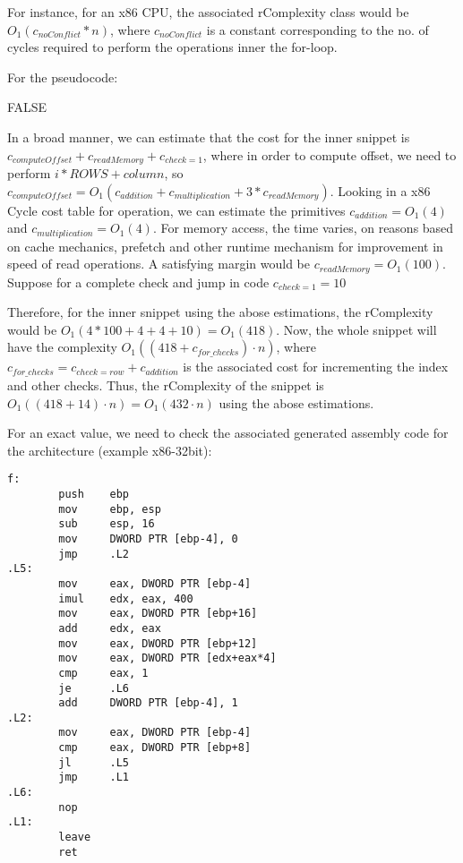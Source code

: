 For instance, for an x86 CPU, the associated rComplexity class would be
$ O_{1}(c_{noConflict} * n) $, where $c_{noConflict}$ is a constant corresponding to the no. of cycles required to perform the operations inner the for-loop.

For the pseudocode:
\begin{algorithmic}[1]
			\State \Return FALSE
		\EndIf
	\EndFor
\end{algorithmic}
In a broad manner, we can estimate that the cost for the inner snippet is $c_{computeOffset} + c_{readMemory} + c_{check=1}$, where in order to compute offset, we need to perform $i * ROWS + column$, so
$ c_{computeOffset} = O_{1}(c_{addition} + c_{multiplication} + 3 * c_{readMemory})$.
Looking in a x86 Cycle cost table for operation, we can estimate the primitives $c_{addition} = O_{1}(4)$ and $c_{multiplication} = O_{1}(4)$. For memory access, the time varies, on reasons based on cache mechanics, prefetch and other runtime mechanism for improvement in speed of read operations. A satisfying margin would be $c_{readMemory} = O_{1}(100)$. 
Suppose for a complete check and jump in code $c_{check=1} = 10$

Therefore, for the inner snippet using the abose estimations, the rComplexity would be $O_{1}(4 * 100 + 4 + 4 + 10) = O_{1}(418)$. Now, the whole snippet will have the complexity $O_{1}((418 + c_{for\_checks}) \cdot n)$, where  $c_{for\_checks} = c_{check=row} + c_{addition}$ is the associated cost for incrementing the index and other checks. Thus, the rComplexity of the snippet is $O_{1}((418 + 14) \cdot n) = O_{1}(432 \cdot n)$ using the abose estimations.

 
For an exact value, we need to check the associated generated assembly code for the architecture (example x86-32bit):
\begin{verbatim}
f:
        push    ebp
        mov     ebp, esp
        sub     esp, 16
        mov     DWORD PTR [ebp-4], 0
        jmp     .L2
.L5:
        mov     eax, DWORD PTR [ebp-4]
        imul    edx, eax, 400
        mov     eax, DWORD PTR [ebp+16]
        add     edx, eax
        mov     eax, DWORD PTR [ebp+12]
        mov     eax, DWORD PTR [edx+eax*4]
        cmp     eax, 1
        je      .L6
        add     DWORD PTR [ebp-4], 1
.L2:
        mov     eax, DWORD PTR [ebp-4]
        cmp     eax, DWORD PTR [ebp+8]
        jl      .L5
        jmp     .L1
.L6:
        nop
.L1:
        leave
        ret  
\end{verbatim}


